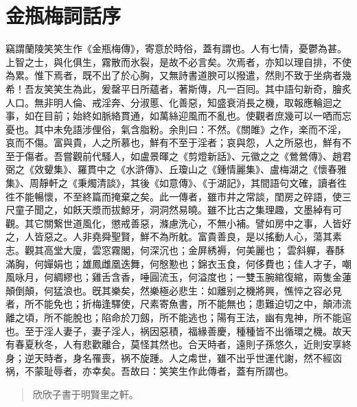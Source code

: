 \chapter*{金瓶梅詞話序}


竊謂蘭陵笑笑生作《金瓶梅傳》，寄意於時俗，蓋有謂也。人有七情，憂鬱為甚。上智之士，與化俱生，霧散而氷裂，是故不必言矣。次焉者，亦知以理自排，不使為累。惟下焉者，既不出了於心胸，又無詩書道腴可以撥遣，然則不致于坐病者幾希！吾友笑笑生為此，爰罄平日所蘊者，著斯傳，凡一百囘。其中語句新奇，膾炙人口。無非明人倫、戒淫奔、分淑慝、化善惡，知盛衰消長之機，取報應輪迴之事，如在目前；始終如脈絡貫通，如萬絲迎風而不亂也。使觀者庶幾可以一哂而忘憂也。其中未免語涉俚俗，氣含脂粉。余則曰：不然。《關雎》之作，楽而不淫，哀而不傷。富與貴，人之所慕也，鮮有不至于淫者；哀與怨，人之所惡也，鮮有不至于傷者。吾嘗觀前代騷人，如盧景暉之《剪燈新話》、元徽之之《鶯鶯傳》、趙君弼之《效顰集》、羅貫中之《水滸傳》、丘瓊山之《鍾情麗集》、盧梅湖之《懷春雅集》、周靜軒之《秉燭清談》，其後《如意傳》、《于湖記》，其間語句文確，讀者徃徃不能暢懷，不至終篇而掩棄之矣。此一傳者，雖市井之常談，閨房之碎語，使三尺童子聞之，如飫天漿而拔鯨牙，洞洞然易曉。雖不比古之集理趣，文墨綽有可觀。其它關繋世道風化，懲戒善惡，滌慮洗心，不無小補。譬如房中之事，人皆好之，人皆惡之。人非堯舜聖賢，鮮不為所躭。富貴善良，是以搖動人心，蕩其素志。觀其高堂大廈，雲窓霧閣，何深沉也；金屏綉褥，何美麗也；𩯭雲斜軃，春酥滿胸，何嬋娟也；雄鳳雌凰迭舞，何慇懃也；錦衣玉食，何侈費也；佳人才子，嘲風咏月，何綢繆也；雞舌含香，唾圓流玉，何溢度也；一雙玉腕綰復綰，兩隻金蓮顛倒顛，何猛浪也。旣其樂矣，然樂極必悲生：如離别之機將興，憔悴之容必見者，所不能免也；折梅逢驛使，尺素寄魚書，所不能無也；患難迫切之中，顛沛流離之頃，所不能脫也；陷命於刀劔，所不能逃也；陽有王法，幽有鬼神，所不能逭也。至于淫人妻子，妻子淫人，祸因惡積，福緣善慶，種種皆不出循環之機。故天有春夏秋冬，人有悲歡離合，莫怪其然也。合天時者，遠則子孫悠久，近則安享終身；逆天時者，身名罹喪，祸不旋踵。人之䖏世，雖不出乎世運代謝，然不經㐫祸，不蒙耻辱者，亦幸矣。吾故曰：笑笑生作此傳者，蓋有所謂也。

\begin{quotation}\begin{flushright}欣欣子書于明賢里之軒。\end{flushright}\end{quotation}

